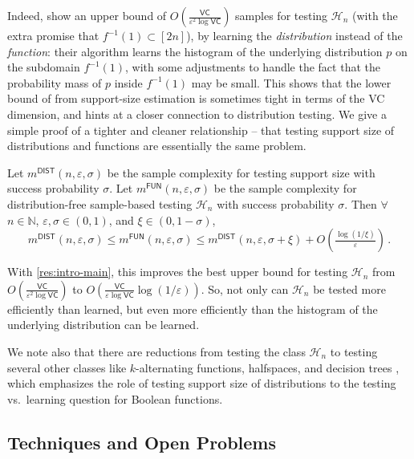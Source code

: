 \documentclass{theoretics}
\newcommand{\cH}{\ensuremath{\mathcal{H}}}
\newcommand{\bN}{\ensuremath{\mathbb{N}}}
\newcommand{\successprob}{\sigma}
\newcommand{\VC}{\mathsf{VC}}
\newcommand{\DIST}{\mathsf{DIST}}
\newcommand{\FUN}{\mathsf{FUN}}
\renewcommand{\epsilon}{\varepsilon}
\begin{document}
Indeed, \cite{GR16} show an upper bound of $O(\tfrac{\VC}{\epsilon^2 \log \VC})$ samples for testing
$\cH_n$ (with the extra promise that $f^{-1}(1) \subset [2n]$), by learning the \emph{distribution}
instead of the \emph{function}: their algorithm learns the histogram of the underlying
distribution $p$ on the subdomain $f^{-1}(1)$, with some adjustments to handle the fact that the
probability mass of $p$ inside $f^{-1}(1)$ may be small. This shows that the lower bound of
\cite{BFH21} from support-size estimation is sometimes tight in terms of the VC dimension, and hints
at a closer connection to distribution testing.  We give a simple proof of a tighter and cleaner
relationship -- that testing support size of distributions and functions are essentially the same
problem.

\begin{theorem}
\label{res:intro-functions}
Let $m^\DIST(n,\epsilon,\successprob)$ be the sample
complexity for testing support size with success probability $\successprob$.
Let $m^\FUN(n,\epsilon, \successprob)$ be
the sample complexity for distribution-free sample-based testing $\cH_n$ with success
probability $\successprob$.
Then $\forall$ $n \in \bN$, $\epsilon, \successprob \in (0,1)$, and $\xi \in (0, 1-\successprob)$,
\[
  m^\DIST(n,\epsilon,\successprob) \leq m^\FUN(n,\epsilon,\successprob)
  \leq m^\DIST(n,\epsilon,\successprob+\xi) + O\left(\tfrac{\log(1/\xi)}{\epsilon}\right) \,.
\]
\end{theorem}

With \cref{res:intro-main}, this improves the best upper bound for testing $\cH_n$ from
$O(\tfrac{\VC}{\epsilon^2 \log \VC})$ \cite{GR16} to $O(\tfrac{\VC}{\epsilon \log \VC}
\log(1/\epsilon))$. So, not only can $\cH_n$ be tested more efficiently than learned, but
even more efficiently than the histogram of the
underlying distribution can be learned.


We note also that there are reductions from testing the class $\cH_n$ to testing several other
classes like $k$-alternating functions, halfspaces, and decision trees \cite{BFH21,FH23}, which
emphasizes the role of testing support size of distributions to the testing vs.~learning question
for Boolean functions.

\subsection{Techniques and Open Problems}
\end{document}
